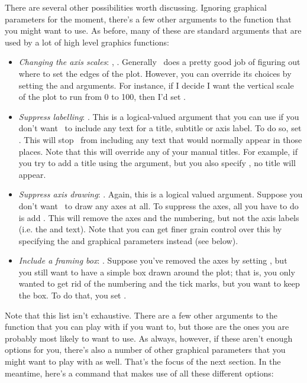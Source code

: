 \noindent
There are several other possibilities worth discussing. Ignoring graphical parameters for the moment, there's a few other arguments to the  function that you might want to use. As before,  many of these are standard arguments that are used by a lot of high level graphics functions:
\begin{itemize} 
\item {\it Changing the axis scales}: , . Generally \R\ does a pretty good job of figuring out where to set the edges of the plot. However, you can override its choices by setting the  and  arguments. For instance, if I decide I want the vertical scale of the plot to run from 0 to 100, then I'd set . 
\item {\it Suppress labelling}: . This is a logical-valued argument that you can use if you don't want \R\ to include any text for a title, subtitle or axis label. To do so, set . This will stop \R\ from including any text that would normally appear in those places. Note that this will override any of your manual titles. For example, if you try to add a title using the  argument, but you also specify , no title will appear.
\item {\it Suppress axis drawing}: . Again, this is a logical valued argument. Suppose you don't want \R\ to draw any axes at all. To suppress the axes, all you have to do is add . This will remove the axes and the numbering, but not the axis labels (i.e. the  and  text). Note that you can get finer grain control over this by specifying the  and  graphical parameters instead (see below).
\item {\it Include a framing box}: . Suppose you've removed the axes by setting , but you still want to have a simple box drawn around the plot; that is, you only wanted to get rid of the numbering and the tick marks, but you want to keep the box. To do that, you set . 
\end{itemize}
Note that this list isn't exhaustive. There are a few other arguments to the  function that you can play with if you want to, but those are the ones you are probably most likely to want to use. As always, however, if these aren't enough options for you, there's also a number of other graphical parameters that you might want to play with as well. That's the focus of the next section. In the meantime, here's a command that makes use of all these different options:
